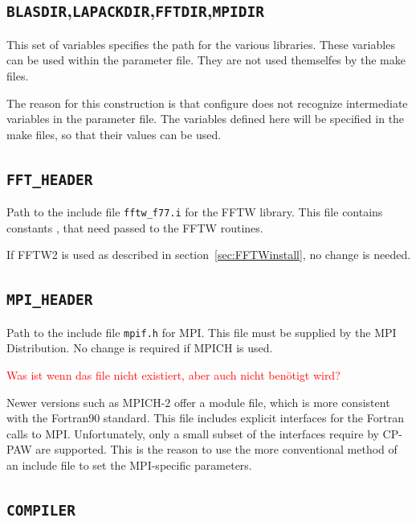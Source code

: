\documentclass[a4paper,10pt]{report}
\newcommand{\mytt}[1]{{\tt #1}}
\begin{document}
\subsection{\mytt{BLASDIR},\mytt{LAPACKDIR},\mytt{FFTDIR},\mytt{MPIDIR}}

This set of variables specifies the path for the various
libraries. These variables can be used within the parameter file. They
are not used themselfes by the make files.

The reason for this construction is that configure does not recognize
intermediate variables in the parameter file. The variables defined
here will be specified in the make files, so that their values can be used.

\subsection{\mytt{FFT\_HEADER}}
Path to the include file \mytt{fftw\_f77.i} for the FFTW library.
This file contains constants , that need passed to the FFTW routines.

If FFTW2 is used as described in section~\ref{sec:FFTWinstall}, no change is needed.

\subsection{\mytt{MPI\_HEADER}}
Path to the include file \mytt{mpif.h} for MPI. This file must be
supplied by the MPI Distribution. No change is required if MPICH is
used.

\textcolor{red}{ Was ist wenn das file nicht existiert, aber auch
nicht ben\"otigt wird?}

Newer versions such as MPICH-2 offer a module file, which is more
consistent with the Fortran90 standard. This file includes explicit
interfaces for the Fortran calls to MPI. Unfortunately, only a small
subset of the interfaces require by CP-PAW are supported. This is the
reason to use the more conventional method of an include file to set
the MPI-specific parameters.

\subsection{\mytt{COMPILER}}
\end{document}
